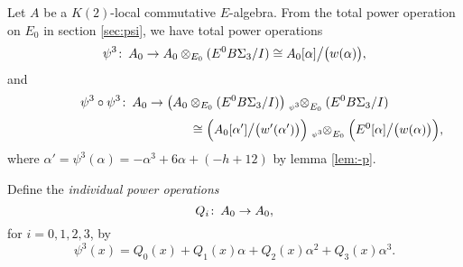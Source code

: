 \documentclass{gtpart}
\theoremstyle{definition}
\theoremstyle{remark}
\def\co{\colon\thinspace}
\newcommand{\A}{\alpha}
\newcommand{\p}{\psi^3}
\begin{document}
Let $A$ be a $K(2)$-local commutative $E$-algebra.  
From the total power operation on $E_0$ in section \ref{sec:psi}, we have total power operations 
\[
 \p \co A_0 \to A_0 \otimes_{E_0} (E^0 B\Sigma_3 / I) \cong A_0 [\A] \big/ \big( w(\A) \big), 
\]
and 
\[
 \p \circ \p \co A_0 \to \big( A_0 \otimes_{E_0} (E^0 B\Sigma_3 / I) \big) \tensor[_{\scriptscriptstyle{\p}}]{\otimes}{_{E_0}} (E^0 B\Sigma_3 / I) 
\]
\[
 ~~~~~~~~~~~~~~~~~~~~~~~~~~~~~~~~~~~~~~~~\cong \Big( A_0 [\A'] \big/ \big( w'(\A') \big) \Big) \tensor[_{\scriptscriptstyle{\p}}]{\otimes}{_{E_0}} \Big( E^0 [\A] \big/ \big( w(\A) \big) \Big), 
\]
where $\A' = \p(\A) = -\A^3 + 6 \A + (-h + 12)$ by lemma \ref{lem:-p}.  

Define the {\em individual power operations} 
\[
 Q_i \co A_0 \to A_0, 
\]
for $i = 0, 1, 2, 3$, by 
\[
 \p (x) = Q_0(x) + Q_1(x) \A + Q_2(x) \A^2 + Q_3(x) \A^3.  
\]
\end{document}
